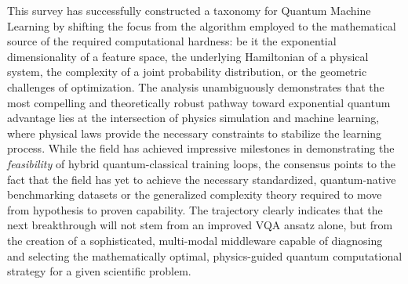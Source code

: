 \documentclass{article}
\begin{document}
This survey has successfully constructed a taxonomy for Quantum Machine Learning by shifting the focus from the algorithm employed to the mathematical source of the required computational hardness: be it the exponential dimensionality of a feature space, the underlying Hamiltonian of a physical system, the complexity of a joint probability distribution, or the geometric challenges of optimization. The analysis unambiguously demonstrates that the most compelling and theoretically robust pathway toward exponential quantum advantage lies at the intersection of physics simulation and machine learning, where physical laws provide the necessary constraints to stabilize the learning process. While the field has achieved impressive milestones in demonstrating the \textit{feasibility} of hybrid quantum-classical training loops, the consensus points to the fact that the field has yet to achieve the necessary standardized, quantum-native benchmarking datasets or the generalized complexity theory required to move from hypothesis to proven capability. The trajectory clearly indicates that the next breakthrough will not stem from an improved VQA ansatz alone, but from the creation of a sophisticated, multi-modal middleware capable of diagnosing and selecting the mathematically optimal, physics-guided quantum computational strategy for a given scientific problem.



\end{document}
